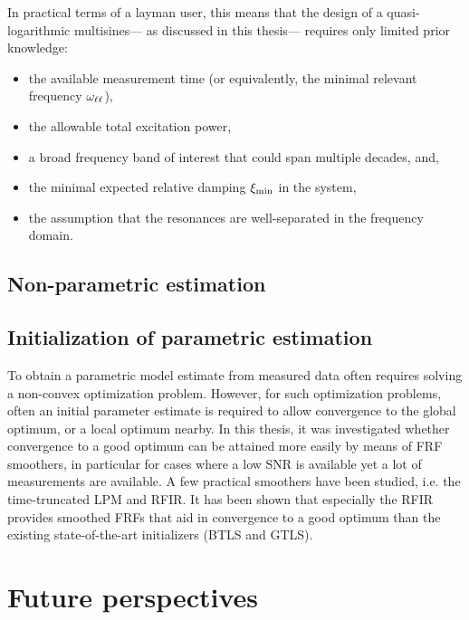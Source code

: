   In practical terms of a layman user, this means that the design of a quasi-logarithmic multisines--- as discussed in this thesis--- requires only limited prior knowledge:
  \begin{itemize}
    \item the available measurement time (or equivalently, the minimal relevant frequency $\omegaLinLog$),
    \item the allowable total excitation power,
    \item a broad frequency band of interest that could span multiple decades, and,\
    \item the minimal expected relative damping $\damping[\min]$ in the system,
    \item the assumption that the resonances are well-separated in the frequency domain.
  \end{itemize}

  \subsection{Non-parametric estimation}

  \subsection{Initialization of parametric estimation}
  To obtain a parametric model estimate from measured data often requires solving a non-convex optimization problem.
  However, for such optimization problems, often an initial parameter estimate is required to allow convergence to the global optimum, or a local optimum nearby.
  In this thesis, it was investigated whether convergence to a good optimum can be attained more easily by means of \gls{FRF} smoothers, in particular for cases where a low \gls{SNR} is available yet a lot of measurements are available.
  A few practical smoothers have been studied, i.e. the time-truncated \gls{LPM} and \gls{RFIR}.
  It has been shown that especially the \gls{RFIR} provides smoothed \glspl{FRF} that aid in convergence to a good optimum than the existing state-of-the-art initializers (\gls{BTLS} and \gls{GTLS}).

\section{Future perspectives}

